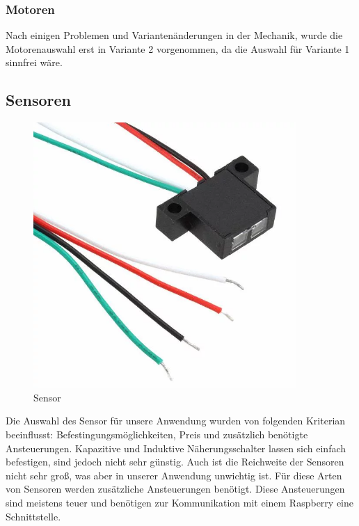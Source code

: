 \subsubsection{Motoren}
Nach einigen Problemen und Variantenänderungen in der Mechanik, wurde die Motorenauswahl erst in Variante 2 vorgenommen, da die Auswahl für Variante 1 sinnfrei wäre.

\subsection{Sensoren}
\begin{figure}[H] 
\begin{center}

\includegraphics[width=10cm]{Bilder/Bauteile/Sensor}
\caption{Sensor}
\label{Sensor}

\end{center}
\end{figure}
Die Auswahl des Sensor für unsere Anwendung wurden von folgenden Kriterian beeinflusst: Befestingungsmöglichkeiten, Preis und zusätzlich benötigte Ansteuerungen.
Kapazitive und Induktive Näherungsschalter lassen sich einfach befestigen, sind jedoch nicht sehr günstig. Auch ist die Reichweite der Sensoren nicht sehr groß, was aber in unserer Anwendung unwichtig ist. Für diese Arten von Sensoren werden zusätzliche Ansteuerungen benötigt. Diese Ansteuerungen sind meistens teuer und benötigen zur Kommunikation mit einem Raspberry eine Schnittstelle.
